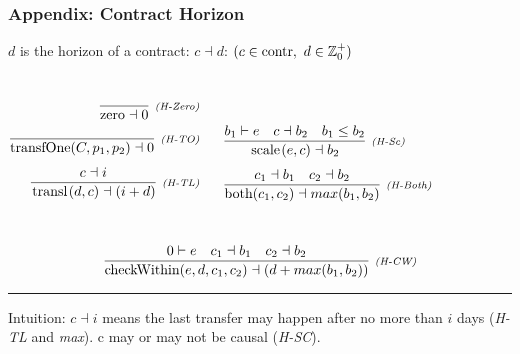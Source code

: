 \documentclass[xcolor=dvipsnames,11pt]{beamer}
\renewcommand{\emph}[1]{\textcolor{structure!90}{#1}}
\newcommand{\ttt}[1]{\mbox{\cd{#1}}}
\newcommand{\zero}{\ttt{zero}}
\newcommand{\transfOne}{\ttt{transfOne}}
\newcommand{\scale}{\ttt{scale}}
\newcommand{\transl}{\ttt{transl}}
\newcommand{\both}{\ttt{both}}
\newcommand{\checkWithin}{\ttt{checkWithin}}
\begin{document}
\begin{frame}[fragile,t]
    \frametitle{Appendix: Contract Horizon}

\emph{$d$ is the horizon} of a contract: $ c \dashv d$:
{\scriptsize $ (c \in \ttt{contr},\ d \in \mathbb{Z}_0^+) $}

\begin{columns}
\begin{align*}
\crule{(H-Zero)}{}{\zero \dashv 0}&\\[1ex]
\crule{(H-TO)}{}{\transfOne(C,p_1,p_2)\dashv 0}&\\[1ex]
\crule{(H-TL)}{c \dashv i }{\transl(d,c) \dashv (i + d) }&\\[1ex]
\end{align*}

\begin{align*}
&\\[1ex]
&\crule{(H-Sc)}{b_1 \vdash e\ \ \ c \dashv b_2\ \ \ b_1 \leq b_2 }{\scale(e,c) \dashv b_2 }\\[1ex]
&\crule{(H-Both)}{c_1 \dashv b_1 \ \ \ c_2 \dashv b_2 }{\both(c_1,c_2) \dashv max(b_1,b_2) }\\[1ex]
\end{align*}
\end{columns}
$$ 
\crule{(H-CW)}{0\vdash e\ \ \ c_1 \dashv b_1 \ \ \ c_2 \dashv b_2 }{\checkWithin(e,d,c_1,c_2) \dashv (d + max(b_1,b_2)) }
$$

\medskip
\hrule
\medskip

\emph{Intuition:} $c \dashv i$ means the last transfer may happen after no more than $i$ days (\textit{H-TL} and \textit{max}). c may or may not be causal (\textit{H-SC}).

\end{frame}
\end{document}
